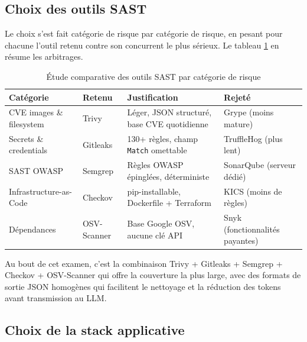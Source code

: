     \subsection{Choix des outils SAST}

        Le choix s'est fait catégorie de risque par catégorie de risque, en pesant pour
        chacune l'outil retenu contre son concurrent le plus sérieux. Le tableau
        \ref{tab:sast_comp} en résume les arbitrages.

        \begin{table}[H]
        \centering
        \begin{tabular}{|m{2.3cm}|m{2cm}|m{4.5cm}|m{3cm}|}
        \hline
        \textbf{Catégorie} & \textbf{Retenu} & \textbf{Justification} & \textbf{Rejeté} \\
        \hline
        CVE images \& filesystem & Trivy & Léger, JSON structuré, base CVE quotidienne & Grype (moins mature) \\
        \hline
        Secrets \& credentials & Gitleaks & 130+ règles, champ \texttt{Match} omettable & TruffleHog (plus lent) \\
        \hline
        SAST OWASP & Semgrep & Règles OWASP épinglées, déterministe & SonarQube (serveur dédié) \\
        \hline
        Infrastructure-as-Code & Checkov & pip-installable, Dockerfile + Terraform & KICS (moins de règles) \\
        \hline
        Dépendances & OSV-Scanner & Base Google OSV, aucune clé API & Snyk (fonctionnalités payantes) \\
        \hline
        \end{tabular}
        \caption{Étude comparative des outils SAST par catégorie de risque}
        \label{tab:sast_comp}
        \end{table}

        Au bout de cet examen, c'est la combinaison Trivy \cite{Trivy} + Gitleaks
        \cite{Gitleaks} + Semgrep \cite{Semgrep} + Checkov \cite{Checkov} + OSV-Scanner
        \cite{OSVScanner} qui offre la couverture la plus large, avec des formats de
        sortie JSON homogènes qui facilitent le nettoyage et la réduction des tokens avant
        transmission au LLM.

    \subsection{Choix de la stack applicative}

